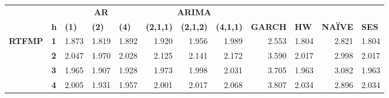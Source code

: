 \begin{table}[htbp]
  \centering
    \begin{tabular}{|cl|rrrrrrrrrr|}
\cmidrule{3-12}    \multicolumn{1}{c}{} &       & \multicolumn{3}{c}{\textbf{AR}} & \multicolumn{3}{c}{\textbf{ARIMA}} &       &       &       &  \\
    \multicolumn{1}{r}{} & \textbf{h} & \multicolumn{1}{l}{\textbf{(1)}} & \multicolumn{1}{l}{\textbf{(2)}} & \multicolumn{1}{l}{\textbf{(4)}} & \multicolumn{1}{l}{\textbf{(2,1,1)}} & \multicolumn{1}{l}{\textbf{(2,1,2)}} & \multicolumn{1}{l}{\textbf{(4,1,1)}} & \multicolumn{1}{l}{\textbf{GARCH}} & \multicolumn{1}{l}{\textbf{HW}} & \multicolumn{1}{l}{\textbf{NAÏVE}} & \multicolumn{1}{l|}{\textbf{SES}} \\
    \midrule
    \multirow{5}[2]{*}{\textbf{RTFMP}} & \textbf{1} & \cellcolor[rgb]{ .847,  .847,  .847}1.873 & \cellcolor[rgb]{ .851,  .851,  .851}1.819 & \cellcolor[rgb]{ .843,  .843,  .843}1.892 & \cellcolor[rgb]{ .843,  .843,  .843}1.920 & \cellcolor[rgb]{ .839,  .839,  .839}1.956 & \cellcolor[rgb]{ .835,  .835,  .835}1.989 & \cellcolor[rgb]{ .784,  .784,  .784}2.553 & \cellcolor[rgb]{ .851,  .851,  .851}1.804 & \cellcolor[rgb]{ .757,  .757,  .757}2.821 & \cellcolor[rgb]{ .851,  .851,  .851}1.804 \\
          & \textbf{2} & \cellcolor[rgb]{ .831,  .831,  .831}2.047 & \cellcolor[rgb]{ .839,  .839,  .839}1.970 & \cellcolor[rgb]{ .831,  .831,  .831}2.028 & \cellcolor[rgb]{ .824,  .824,  .824}2.125 & \cellcolor[rgb]{ .82,  .82,  .82}2.141 & \cellcolor[rgb]{ .82,  .82,  .82}2.172 & \cellcolor[rgb]{ .686,  .686,  .686}3.590 & \cellcolor[rgb]{ .831,  .831,  .831}2.017 & \cellcolor[rgb]{ .741,  .741,  .741}2.998 & \cellcolor[rgb]{ .831,  .831,  .831}2.017 \\
          & \textbf{3} & \cellcolor[rgb]{ .839,  .839,  .839}1.965 & \cellcolor[rgb]{ .843,  .843,  .843}1.907 & \cellcolor[rgb]{ .843,  .843,  .843}1.928 & \cellcolor[rgb]{ .835,  .835,  .835}1.973 & \cellcolor[rgb]{ .835,  .835,  .835}1.998 & \cellcolor[rgb]{ .831,  .831,  .831}2.031 & \cellcolor[rgb]{ .675,  .675,  .675}3.705 & \cellcolor[rgb]{ .839,  .839,  .839}1.963 & \cellcolor[rgb]{ .733,  .733,  .733}3.082 & \cellcolor[rgb]{ .839,  .839,  .839}1.963 \\
          & \textbf{4} & \cellcolor[rgb]{ .835,  .835,  .835}2.005 & \cellcolor[rgb]{ .839,  .839,  .839}1.931 & \cellcolor[rgb]{ .839,  .839,  .839}1.957 & \cellcolor[rgb]{ .835,  .835,  .835}2.001 & \cellcolor[rgb]{ .831,  .831,  .831}2.017 & \cellcolor[rgb]{ .827,  .827,  .827}2.068 & \cellcolor[rgb]{ .667,  .667,  .667}3.807 & \cellcolor[rgb]{ .831,  .831,  .831}2.034 & \cellcolor[rgb]{ .749,  .749,  .749}2.896 & \cellcolor[rgb]{ .831,  .831,  .831}2.034 \\

\end{tabular}
\end{table}
